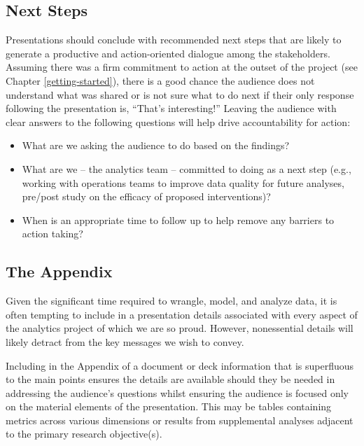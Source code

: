\documentclass[
]{book}
\providecommand{\tightlist}{%
  \setlength{\itemsep}{0pt}\setlength{\parskip}{0pt}}
\begin{document}
\hypertarget{next-steps}{%
\subsection{Next Steps}\label{next-steps}}

Presentations should conclude with recommended next steps that are likely to generate a productive and action-oriented dialogue among the stakeholders. Assuming there was a firm commitment to action at the outset of the project (see Chapter \ref{getting-started}), there is a good chance the audience does not understand what was shared or is not sure what to do next if their only response following the presentation is, ``That's interesting!'' Leaving the audience with clear answers to the following questions will help drive accountability for action:

\begin{itemize}
\tightlist
\item
  What are we asking the audience to do based on the findings?
\item
  What are we -- the analytics team -- committed to doing as a next step (e.g., working with operations teams to improve data quality for future analyses, pre/post study on the efficacy of proposed interventions)?
\item
  When is an appropriate time to follow up to help remove any barriers to action taking?
\end{itemize}

\hypertarget{the-appendix}{%
\subsection{The Appendix}\label{the-appendix}}

Given the significant time required to wrangle, model, and analyze data, it is often tempting to include in a presentation details associated with every aspect of the analytics project of which we are so proud. However, nonessential details will likely detract from the key messages we wish to convey.

Including in the Appendix of a document or deck information that is superfluous to the main points ensures the details are available should they be needed in addressing the audience's questions whilst ensuring the audience is focused only on the material elements of the presentation. This may be tables containing metrics across various dimensions or results from supplemental analyses adjacent to the primary research objective(s).
\end{document}
